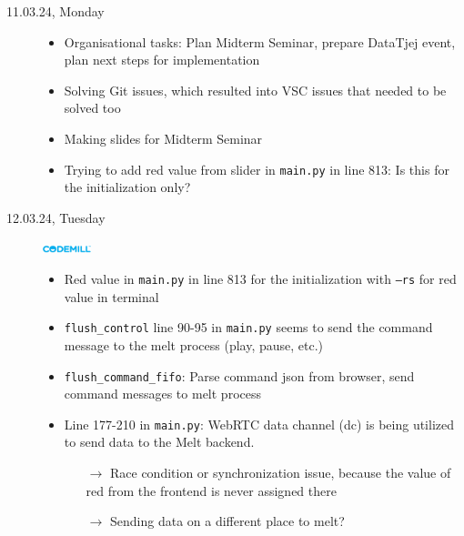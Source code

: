 \documentclass[a4, 11pt]{scrartcl}
\begin{document}
\begin{description}
	
	
	
	\item[11.03.24, Monday]
	\begin{itemize}
		\item[]
		\item Organisational tasks: Plan Midterm Seminar, prepare DataTjej event, plan next steps for implementation
		\item Solving Git issues, which resulted into VSC issues that needed to be solved too
		\item Making slides for Midterm Seminar
		\item Trying to add red value from slider in \texttt{main.py} in line 813: Is this for the initialization only?
	\end{itemize}
	
	
	
	
	
	
	
	
	
	
	\item[12.03.24, Tuesday]
	\includegraphics[width=1.4cm]{codemill.png}
	\begin{itemize}
		\item Red value in \texttt{main.py} in line 813 for the initialization with \texttt{--rs} for red value in terminal
		\item \texttt{flush\_control} line 90-95 in \texttt{main.py} seems to send the command message to the melt process (play, pause, etc.)
		\item \texttt{flush\_command\_fifo}: Parse command json from browser, send command messages to melt process
		\item Line 177-210 in \texttt{main.py}: WebRTC data channel (dc) is being utilized to send data to the Melt backend.
		\begin{itemize}
			\item[$\rightarrow$] Race condition or synchronization issue, because the value of red from the frontend is never assigned there
			\item[$\rightarrow$] Sending data on a different place to melt? 
		\end{itemize}
	\end{itemize}
	

\end{description}
\end{document}
